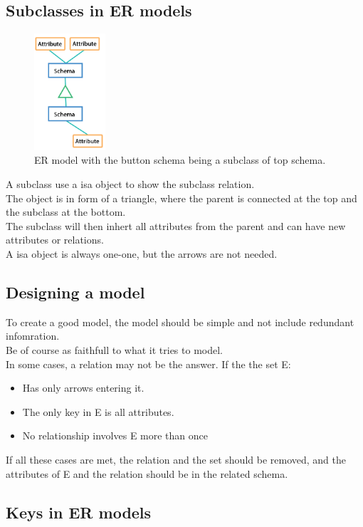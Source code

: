 \documentclass[12pt, a4paper]{article}
\begin{document}
		\subsection{Subclasses in ER models}
		
		\begin{figure}[h]
			\centering
			\caption{ER model with the button schema being a subclass of top schema.}
			\includegraphics[width=100px]{assets/ERSubclass.png}
		\end{figure}
			A subclass use a isa object to show the subclass relation.\\
			The object is in form of a triangle, where the parent is connected at the top and the subclass at the bottom.\\
			The subclass will then inhert all attributes from the parent and can have new attributes or relations.\\
			A isa object is always one-one, but the arrows are not needed.
		\subsection{Designing a model}
			To create a good model, the model should be simple and not include redundant infomration.\\
			Be of course as faithfull to what it tries to model.\\
			In some cases, a relation may not be the answer. If the the set E:
			\begin{itemize}
						\item Has only arrows entering it.
						\item The only key in E is all attributes.
						\item No relationship involves E more than once
			\end{itemize}
			If all these cases are met, the relation and the set should be removed, and the attributes of E and the relation should be in the related schema.\\

			
		\subsection{Keys in ER models}
		
\end{document}
